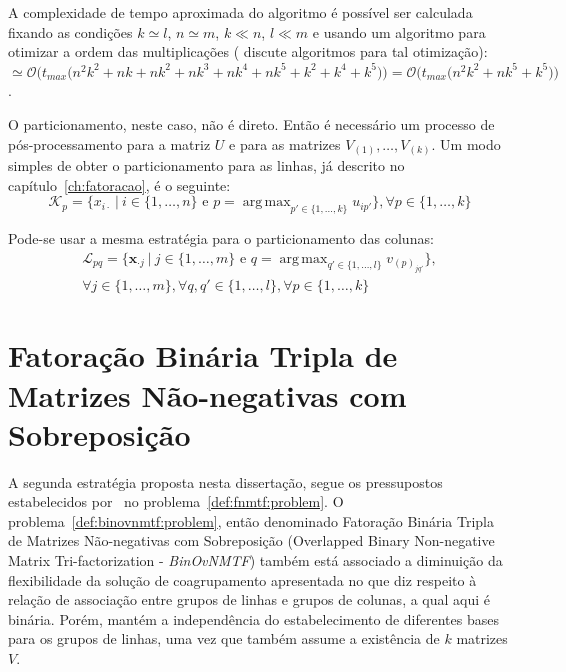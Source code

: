 \documentclass[
    12pt,                %
    oneside,            %
    a4paper,            %
    english,            %
    brazil                %
    ]{abntex2ppgsi}
\DeclareMathOperator*{\argmax}{arg\,max}
\begin{document}
A complexidade de tempo aproximada do algoritmo é possível ser calculada fixando as condições $k \simeq l$, $n \simeq m$, $k \ll n$, $l \ll m$ e usando um algoritmo para otimizar a ordem das multiplicações ( discute algoritmos para tal otimização): $\simeq \mathcal{O}\Big( t_{max} \big( n^2k^2 + nk + nk^2 + nk^3 + nk^4 + nk^5 + k^2 + k^4 + k^5 \big) \Big) = \mathcal{O}\Big( t_{max} \big( n^2k^2 + nk^5 + k^5 \big) \Big)$.


O particionamento, neste caso, não é direto.
Então é necessário um processo de pós-processamento para a matriz $U$ e para as matrizes $V_{(1)}, \dots, V_{(k)}$.
Um modo simples de obter o particionamento para as linhas, já descrito no capítulo~\ref{ch:fatoracao}, é o seguinte:
\[
    \mathcal{K}_{p}=\{x_{i\cdot}~|~i\in\{1,\dots,n\}\text{ e }p=\argmax_{p'\in\{1,\dots,k\}} u_{ip'} \}, \forall p\in\{1,\dots,k\}
\]

Pode-se usar a mesma estratégia para o particionamento das colunas:
\begin{align*}
    \mathcal{L}_{pq} = \{ \mathbf{x}_{\cdot j}~|~j \in \{1, \dots, m \} \text{ e } q = \argmax_{q' \in \{1, \dots, l\}} v_{(p)_{j q'}} \}, \\
    \forall j \in \{1, \dots, m\}, \forall q, q' \in \{1, \dots, l\}, \forall p \in \{1, \dots, k\}
\end{align*}

\section{Fatoração Binária Tripla de Matrizes Não-negativas com Sobreposição}


A segunda estratégia proposta nesta dissertação, segue os pressupostos estabelecidos por~ no problema~\ref{def:fnmtf:problem}.
O problema~\ref{def:binovnmtf:problem}, então denominado Fatoração Binária Tripla de Matrizes Não-negativas com Sobreposição (Overlapped Binary Non-negative Matrix Tri-factorization - \textit{BinOvNMTF}) também está associado a diminuição da flexibilidade da solução de coagrupamento apresentada no que diz respeito à relação de associação entre grupos de linhas e grupos de colunas, a qual aqui é binária.
Porém, mantém a independência do estabelecimento de diferentes bases para os grupos de linhas, uma vez que também assume a existência de $k$ matrizes $V$.
\end{document}
